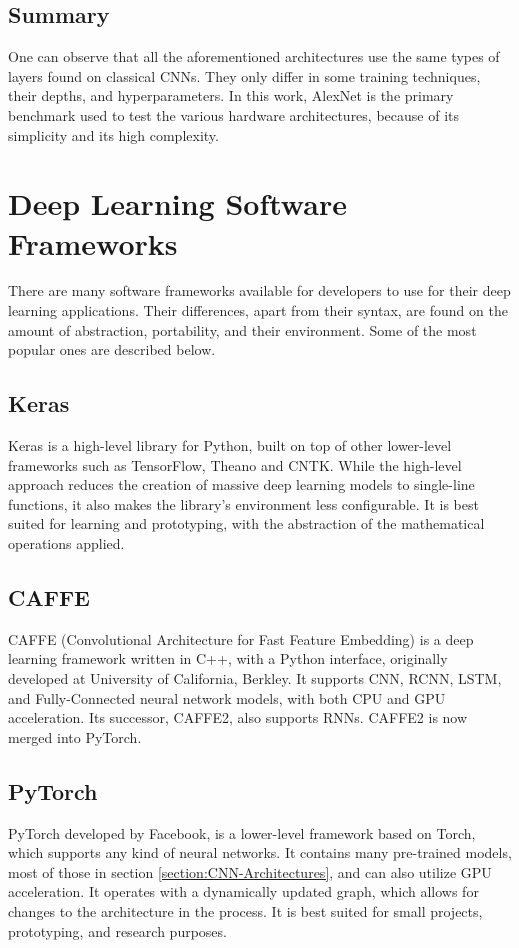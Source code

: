 \subsection{Summary}
One can observe that all the aforementioned architectures use the same types of layers found on classical CNNs. They only differ in some training techniques, their depths, and hyperparameters. In this work, AlexNet is the primary benchmark used to test the various hardware architectures, because of its simplicity and its high complexity.

\section{Deep Learning Software Frameworks}
There are many software frameworks available for developers to use for their deep learning applications. Their differences, apart from their syntax, are found on the amount of abstraction, portability, and their environment. Some of the most popular ones are described below.

\subsection{Keras}
Keras \cite{Keras-Official-site} \cite{Keras-Wikipedia} is a high-level library for Python, built on top of other lower-level frameworks such as TensorFlow, Theano and CNTK. While the high-level approach reduces the creation of massive deep learning models to single-line functions, it also makes the library's environment less configurable. It is best suited for learning and prototyping, with the abstraction of the mathematical operations applied.

\subsection{CAFFE}
CAFFE (Convolutional Architecture for Fast Feature Embedding) \cite{Caffe-Convolutional-Architecture-for-Fast-Feature-Embedding} \cite{Caffe-Official-site} \cite{Caffe-Wikipedia} is a deep learning framework written in C++, with a Python interface, originally developed at University of California, Berkley. It supports CNN, RCNN, LSTM, and Fully-Connected neural network models, with both CPU and GPU acceleration. Its successor, CAFFE2, also supports RNNs. CAFFE2 is now merged into PyTorch.

\subsection{PyTorch}
PyTorch \cite{PyTorch-Official-site} \cite{PyTorch-Wikipedia} developed by Facebook, is a lower-level framework based on Torch, which supports any kind of neural networks. It contains many pre-trained models, most of those in section \ref{section:CNN-Architectures}, and can also utilize GPU acceleration. It operates with a dynamically updated graph, which allows for changes to the architecture in the process. It is best suited for small projects, prototyping, and research purposes.


